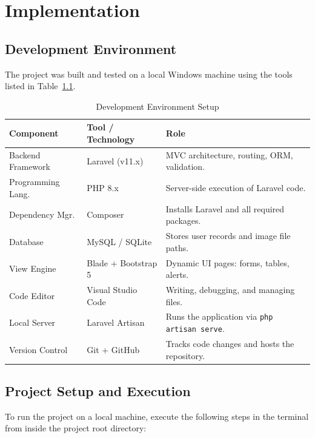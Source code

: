 \documentclass[12pt,a4paper]{report}
\begin{document}
\chapter{Implementation}

\section{Development Environment}

The project was built and tested on a local Windows machine using the tools listed in
Table~\ref{tab:devenv}.

\begin{table}[h!]
\centering
\caption{Development Environment Setup}
\label{tab:devenv}
\renewcommand{\arraystretch}{1.3}
\begin{tabularx}{\textwidth}{@{}llX@{}}
\toprule
\textbf{Component} & \textbf{Tool / Technology} & \textbf{Role} \\
\midrule
Backend Framework  & Laravel (v11.x) & MVC architecture, routing, ORM, validation. \\
Programming Lang.  & PHP 8.x         & Server-side execution of Laravel code. \\
Dependency Mgr.    & Composer        & Installs Laravel and all required packages. \\
Database           & MySQL / SQLite  & Stores user records and image file paths. \\
View Engine        & Blade + Bootstrap 5 & Dynamic UI pages: forms, tables, alerts. \\
Code Editor        & Visual Studio Code & Writing, debugging, and managing files. \\
Local Server       & Laravel Artisan & Runs the application via \texttt{php artisan serve}. \\
Version Control    & Git + GitHub    & Tracks code changes and hosts the repository. \\
\bottomrule
\end{tabularx}
\end{table}

\section{Project Setup and Execution}

To run the project on a local machine, execute the following steps in the terminal
from inside the project root directory:
\end{document}
